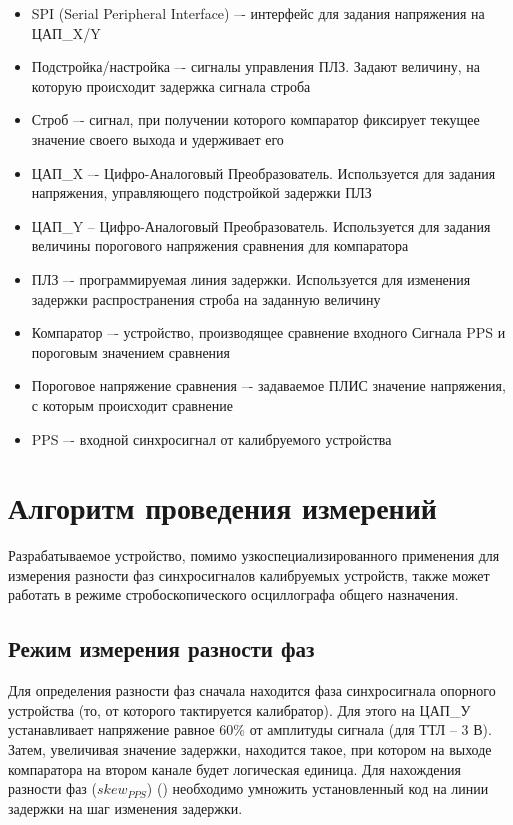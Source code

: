 \FloatBarrier


\begin{itemize}[label={}]
	\item SPI (Serial Peripheral Interface) –- интерфейс для задания напряжения на ЦАП\_X/Y
	\item Подстройка/настройка –- сигналы управления ПЛЗ. Задают величину, на которую происходит задержка сигнала строба
	\item Строб –- сигнал, при получении которого компаратор фиксирует текущее значение своего выхода и удерживает его
	\item ЦАП\_X –- Цифро-Аналоговый Преобразователь. Используется для задания напряжения, управляющего подстройкой задержки ПЛЗ
	\item ЦАП\_Y -- Цифро-Аналоговый Преобразователь. Используется для задания величины порогового напряжения сравнения для компаратора
	\item ПЛЗ –- программируемая линия задержки. Используется для изменения задержки распространения строба на заданную величину
	\item Компаратор –- устройство, производящее сравнение входного Сигнала PPS и пороговым значением сравнения
	\item Пороговое напряжение сравнения –- задаваемое ПЛИС значение напряжения, с которым происходит сравнение
	\item PPS –- входной синхросигнал от калибруемого устройства
\end{itemize}

\section{Алгоритм проведения измерений}

Разрабатываемое устройство, помимо узкоспециализированного применения для измерения разности фаз синхросигналов
калибруемых устройств, также может работать в режиме стробоскопического осциллографа общего назначения.

\subsection{Режим измерения разности фаз}

Для определения разности фаз сначала находится фаза синхросигнала опорного устройства (то, от которого тактируется калибратор). Для этого
на ЦАП\_У устанавливает напряжение равное 60\% от амплитуды сигнала (для ТТЛ -- 3 В). Затем, увеличивая значение задержки, находится такое,
при котором на выходе компаратора на втором канале будет логическая единица. Для нахождения разности фаз ($ skew_{PPS} $) ()
необходимо умножить установленный код на линии задержки на шаг изменения задержки.

